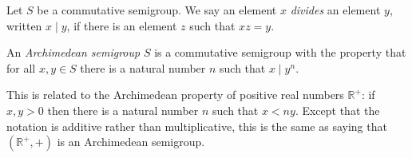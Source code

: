\documentclass[12pt]{article}
\begin{document}
Let $S$ be a commutative semigroup.  We say an element $x$ \emph{divides} an element $y$, written $x \mid y$, if there is an element $z$ such that $xz = y$.

An \emph{Archimedean semigroup} $S$ is a commutative semigroup with the property that for all $x, y \in S$ there is a natural number $n$ such that $x \mid y^n$.

This is related to the Archimedean property of positive real numbers $\mathbb{R}^+$: if $x, y > 0$ then there is a natural number $n$ such that $x < ny$.  Except that the notation is additive rather than multiplicative, this is the same as saying that $(\mathbb{R}^+, +)$ is an Archimedean semigroup.
\end{document}
